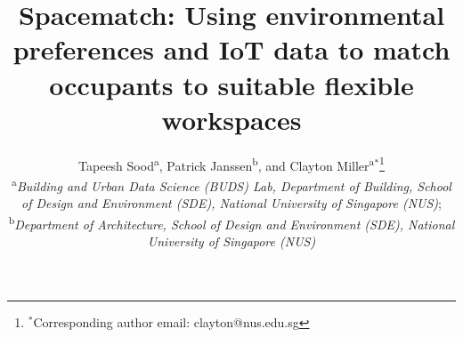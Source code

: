\documentclass[]{interact}
\theoremstyle{plain}%
\theoremstyle{definition}
\theoremstyle{remark}
\begin{document}

\title{Spacematch: Using environmental preferences and IoT data to match occupants to suitable flexible workspaces}

\author{Tapeesh Sood\textsuperscript{a},
Patrick Janssen\textsuperscript{b},
and Clayton Miller\textsuperscript{a}$^{\ast}$\thanks{$^\ast$Corresponding author email: clayton@nus.edu.sg}\\
\vspace{6pt}
\textsuperscript{a}{\em Building and Urban Data Science (BUDS) Lab, Department of Building, School of Design and Environment (SDE), National University of Singapore (NUS)};\\
\textsuperscript{b}{\em Department of Architecture, School of Design and Environment (SDE), National University of Singapore (NUS)}
}

\maketitle
\end{document}
